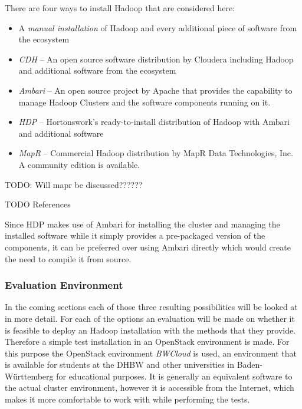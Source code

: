 There are four ways to install Hadoop that are considered here:

\begin{itemize}
    \item A \emph{manual installation} of Hadoop 
        and every additional piece of software from the ecosystem
    \item \emph{\acf{CDH}} --  An open source software distribution by Cloudera including Hadoop
        and additional software from the ecosystem
    \item \emph{Ambari} -- An open source project by Apache that provides
        the capability to manage Hadoop Clusters and the software components running on it.
    \item \emph{\acf{HDP}} -- Hortonswork's ready-to-install distribution of Hadoop 
        with Ambari and additional software
    \item \emph{MapR} -- Commercial Hadoop distribution by MapR Data Technologies, Inc. A community edition is available. 
        
\end{itemize}

TODO: Will mapr be discussed??????

TODO References

Since \ac{HDP} makes use of Ambari for installing the cluster and managing the installed software while it simply provides a pre-packaged version of the components, 
it can be preferred over using Ambari directly which would create the need to compile it from source.


\subsubsection{Evaluation Environment}
In the coming sections each of those three resulting possibilities will be looked at in more detail.
For each of the options an evaluation will be made on whether it is 
feasible to deploy an Hadoop installation with the methods that they provide.
Therefore a simple test installation in an OpenStack environment is made.
For this purpose the OpenStack environment \emph{BWCloud} 
is used, an environment that is available for students at the \ac{DHBW} 
and other universities in Baden-Württemberg for educational purposes. 
It is generally an equivalent software to the actual cluster environment, 
however it is accessible from the Internet, 
which makes it more comfortable to work with while performing the tests.

